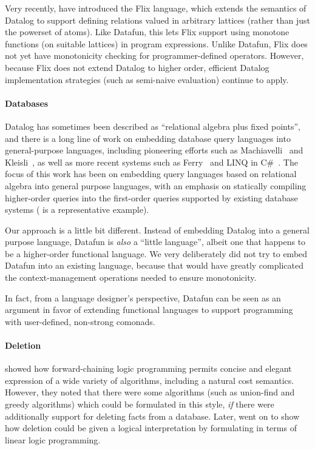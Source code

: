Very recently, \citet{flix} have introduced the Flix language, which
extends the semantics of Datalog to support defining relations valued
in arbitrary lattices (rather than just the powerset of atoms). Like
Datafun, this lets Flix support using monotone functions (on suitable
lattices) in program expressions. Unlike Datafun, Flix does not yet
have monotonicity checking for programmer-defined operators. However,
because Flix does not extend Datalog to higher order, efficient
Datalog implementation strategies (such as semi-naive evaluation)
continue to apply.


\paragraph{Databases} Datalog has sometimes been described
as ``relational algebra plus fixed points'', and there is a long line
of work on embedding database query languages into general-purpose
languages, including pioneering efforts such as
Machiavelli~\cite{machiavelli} and Kleisli~\cite{kleisli}, as well as
more recent systems such as Ferry~\cite{ferry} and LINQ in C\#~\cite{linq-wadler}.
%
The focus of this work has been on embedding query languages based
on relational algebra into general purpose languages, with an emphasis
on statically compiling higher-order queries into the first-order
queries supported by existing database systems (\citet{query-shredding} is a
representative example).

Our approach is a little bit different. Instead of embedding Datalog
into a general purpose language, Datafun is \emph{also} a ``little
language'', albeit one that happens to be a higher-order
functional language. We very deliberately did not try to embed Datafun
into an existing language, because that would have greatly complicated
the context-management operations needed to ensure monotonicity.

In fact, from a language designer's perspective, Datafun can be seen
as an argument in favor of extending functional languages to support
programming with user-defined, non-strong comonads.

\paragraph{Deletion} \citet{logical-algorithms} showed how
forward-chaining logic programming permits concise and elegant
expression of a wide variety of algorithms, including a natural cost
semantics. However, they noted that there were some algorithms (such
as union-find and greedy algorithms) which could be formulated in this
style, \emph{if} there were additionally support for deleting facts
from a database. Later, \citet{linear-logical-algorithms} went on to
show how deletion could be given a logical interpretation by
formulating in terms of linear logic programming.

